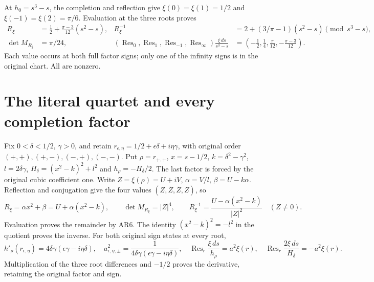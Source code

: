 \documentclass[11pt]{article}
\begin{document}
At $h_0=s^3-s$, the completion and reflection give
$\xi(0)=\xi(1)=1/2$ and $\xi(-1)=\xi(2)=\pi/6$.
Evaluation at the three roots proves
\begin{align}
R_\xi&=\tfrac12+\frac{\pi-3}{12}(s^2-s),&
R_\xi^{-1}&=2+(3/\pi-1)(s^2-s)\pmod{s^3-s},\nonumber\\
\det M_{R_\xi}&=\pi/24,&
(\operatorname{Res}_0,\operatorname{Res}_1,\operatorname{Res}_{-1},\operatorname{Res}_\infty)\frac{\xi\,ds}{s^3-s}
&=(-\tfrac12,\tfrac14,\tfrac{\pi}{12},-\tfrac{\pi-3}{12}).
\tag{AR9}
\end{align}
Each value occurs at both full factor signs; only one of the
infinity signs is in the original chart. All are nonzero.

\section{The literal quartet and every completion factor}
Fix $0<\delta<1/2$, $\gamma>0$, and retain
$r_{\epsilon,\eta}=1/2+\epsilon\delta+i\eta\gamma$,
with original order $(+,+),(+,-),(-,+),(-,-)$.
Put $\rho=r_{+,+}$, $x=s-1/2$, $k=\delta^2-\gamma^2$,
$l=2\delta\gamma$, $H_\delta=(x^2-k)^2+l^2$ and
$h_\rho=-H_\delta/2$. The last factor is forced by the
original cubic coefficient one. Write
$Z=\xi(\rho)=U+iV$, $\alpha=V/l$, $\beta=U-k\alpha$.
Reflection and conjugation give the four values
$(Z,\overline Z,\overline Z,Z)$, so
\begin{equation}
R_\xi=\alpha x^2+\beta=U+\alpha(x^2-k),\qquad
\det M_{R_\xi}=|Z|^4,\qquad
R_\xi^{-1}=\frac{U-\alpha(x^2-k)}{|Z|^2}\quad(Z\ne0).
\tag{AR10}
\end{equation}
Evaluation proves the remainder by AR6. The identity
$(x^2-k)^2=-l^2$ in the quotient proves the inverse.
For both original sign states at every root,
\begin{equation}
h'_\rho(r_{\epsilon,\eta})
=4\delta\gamma(\epsilon\gamma-i\eta\delta),\quad
a_{\epsilon,\eta,\pm}^2
=\frac{1}{4\delta\gamma(\epsilon\gamma-i\eta\delta)},\quad
\operatorname{Res}_r\frac{\xi\,ds}{h_\rho}=a^2\xi(r),\quad
\operatorname{Res}_r\frac{2\xi\,ds}{H_\delta}=-a^2\xi(r).
\tag{AR11}
\end{equation}
Multiplication of the three root differences and $-1/2$
proves the derivative, retaining the original factor and sign.
\end{document}
